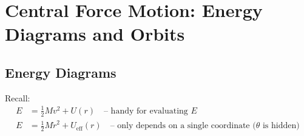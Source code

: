 
\chapter{Central Force Motion: Energy Diagrams and Orbits}

\section{Energy Diagrams}

Recall:
\begin{align*}
  E &= \tfrac{1}{2}Mv^2 + U(r) \tag{1} \quad \text{-- handy for evaluating } E \\
  E &= \tfrac{1}{2}M\dot{r}^2 + U_\text{eff}(r) \tag{2} \quad \text{-- only depends on a single coordinate ($\theta$ is hidden)}
\end{align*}

